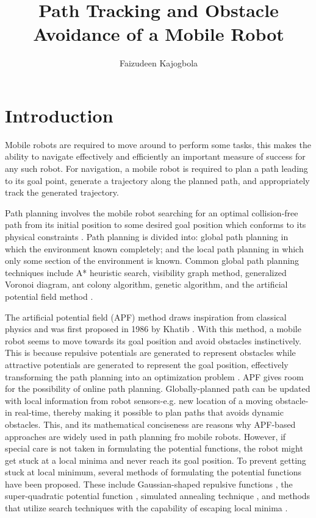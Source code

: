 \documentclass[a4paper, twocolumn]{article}
\title{\Huge{Path Tracking and Obstacle Avoidance of a Mobile Robot}}
\author{Faizudeen Kajogbola}
\date{} %
\begin{document}

\maketitle

\setlength{\headsep}{5pt}
\setlength{\voffset}{-0.75in}   %

\section{Introduction}

Mobile robots are required to move around to perform some tasks, this makes the ability to navigate effectively and efficiently an important measure of success for any such robot.
For navigation, a mobile robot is required to plan a path leading to its goal point, generate a trajectory along the planned path, and appropriately track the generated trajectory.

Path planning involves the mobile robot searching for an optimal collision-free path from its initial position to some desired goal position which conforms to its physical constraints \cite{cai1}.
Path planning is divided into: global path planning in which the environment known completely; and the local path planning in which only some section of the environment is known.
Common global path planning techniques include A* heuristic search, visibility graph method, generalized Voronoi diagram, ant colony algorithm, genetic algorithm, and the artificial potential field method \cite{kunchev1, shi1}.

The artificial potential field (APF) method draws inspiration from classical physics and was first proposed in 1986 by Khatib \cite{khatib1}.
With this method, a mobile robot seems to move towards its goal position and avoid obstacles instinctively. This is because repulsive potentials are generated to represent obstacles while attractive potentials are generated to represent the goal position, effectively transforming the path planning into an optimization problem \cite{ji1}.
APF gives room for the possibility of online path planning. Globally-planned path can be updated with local information from robot sensors-e.g. new location of a moving obstacle- in real-time, thereby making it possible to plan paths that avoids dynamic obstacles.
This, and its mathematical conciseness \cite{shi1} are reasons why APF-based approaches are widely used in path planning fro mobile robots.
However, if special care is not taken in formulating the potential functions, the robot might get stuck at a local minima and never reach its goal position.
To prevent getting stuck at local minimum, several methods of formulating the potential functions have been proposed. These include Gaussian-shaped repulsive functions \cite{koditschek1}, the super-quadratic potential function \cite{volpe1}, simulated annealing technique \cite{zhu1}, and methods that utilize search techniques with the capability of escaping local minima \cite{barraquand1}.
\end{document}
